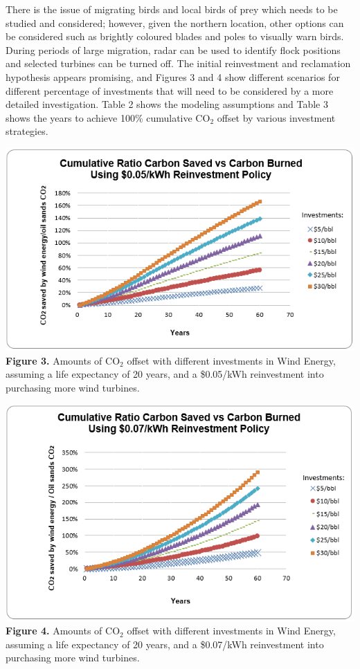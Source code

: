 \documentclass[11pt]{article}
\begin{document}
There is the issue of migrating birds and local birds of prey which needs to be studied and considered; however, given the northern location, other options can be considered such as brightly coloured blades and poles to visually warn birds.  During periods of large migration, radar can be used to identify flock positions and selected turbines can be turned off.
The initial reinvestment and reclamation hypothesis appears promising, and Figures 3 and 4 show different scenarios for different percentage of investments that will need to be considered by a more detailed investigation.  Table 2 shows the modeling assumptions and Table 3 shows the years to achieve 100\% cumulative CO$_2$ offset by various investment strategies.

\begin{center}
\includegraphics{g3.png}
{\bf Figure 3.} Amounts of CO$_2$ offset with different investments in Wind Energy, assuming a life expectancy of 20 years, and a \$0.05/kWh reinvestment into purchasing more wind turbines. 
\end{center}

\begin{center}
\includegraphics{g4.png}
{\bf Figure 4.} Amounts of CO$_2$ offset with different investments in Wind Energy, assuming a life expectancy of 20 years, and a \$0.07/kWh reinvestment into purchasing more wind turbines. 
\end{center}
\end{document}

